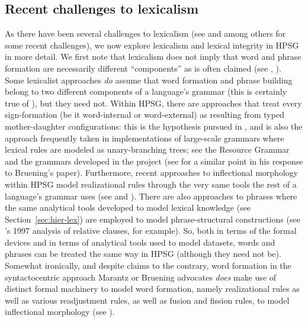 \documentclass[output=paper
 	        ,biblatex
                ,babelshorthands
                ,newtxmath
                ,draftmode
                ,colorlinks, citecolor=brown
]{langscibook}
\begin{document}
\subsection{Recent challenges to lexicalism}

As there have been several challenges to lexicalism (see \citealt{Bruening2018} and  \citealt{Haspelmath2011} among others for some recent challenges), we now explore lexicalism and  lexical integrity in HPSG in more detail. We first note that lexicalism does not imply that word and phrase formation are necessarily different ``components'' as is often claimed (see \citealt{Marantz1997}, \citealt{Bruening2018}). Some lexicalist approaches \emph{do} assume that word formation and phrase building belong to two different components of a language's grammar (this is certainly true of \citealt{Jackendoff1975}), but they need not. Within HPSG, there are approaches that treat every sign-formation (be it word-internal or word-external) as resulting from typed mother-daughter configurations: this is the hypothesis pursued in \citealt{Koenig1999c}, and is also the approach frequently taken in implementations of large-scale grammars where lexical rules are modeled as unary-branching trees; see the  Resource Grammar \citep{Copestake2002} and the grammars developed in the  project \citep{Mueller2015}  (see \citealt[58]{MuellerLexicalism} for a similar point in his response to Bruening's paper). Furthermore, recent approaches to inflectional morphology within HPSG model realizational rules through the very same tools the rest of a language's grammar uses (see \citealt{CrysmannandBonami2016} and ).  There are also approaches to phrases where the same analytical tools developed to model lexical knowledge (see Section~\ref{sec:hier-lex}) are employed to model phrase-structural constructions (see \citeauthor{Sag1997}'s 1997 analysis of relative clauses, for example). So, both in terms of the formal devices and in terms of analytical tools used to model datasets, words and phrases can be treated the same way in HPSG (although they need not be). Somewhat ironically, and despite claims to the contrary, word formation in the syntactocentric approach Marantz or Bruening advocates \emph{does} make use of distinct formal machinery to model word formation, namely realizational rules as well as various readjustment rules, as well as fusion and fission rules, to model inflectional morphology (see \citealt{HalleandMarantz1993,Embick2015}).
\end{document}
